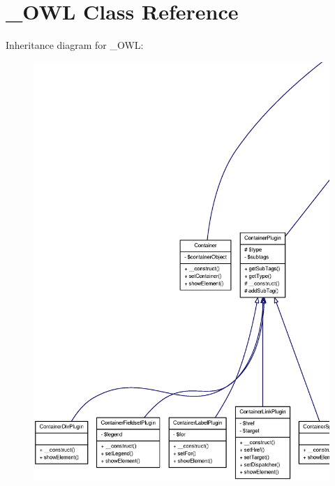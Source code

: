 \section{\_\-OWL Class Reference}
\label{class__OWL}


Inheritance diagram for \_\-OWL:\nopagebreak
\begin{figure}[H]
\begin{center}
\leavevmode
\includegraphics[width=400pt]{class__OWL__inherit__graph}
\end{center}
\end{figure}
